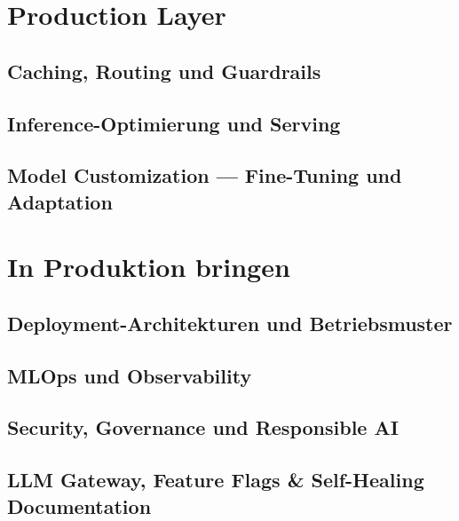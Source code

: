 \documentclass[
  12pt,
  twoside,
  openany,
  headings=big,
  numbers=noenddot,
  parskip=half,
  DIV=12
]{scrbook}
\begin{document}
\part{Production Layer}

\chapter{Caching, Routing und Guardrails}


\chapter{Inference-Optimierung und Serving}


\chapter{Model Customization --- Fine-Tuning und Adaptation}


\part{In Produktion bringen}

\chapter{Deployment-Architekturen und Betriebsmuster}


\chapter{MLOps und Observability}


\chapter{Security, Governance und Responsible AI}


\chapter{LLM Gateway, Feature Flags \& Self-Healing Documentation}

\end{document}
